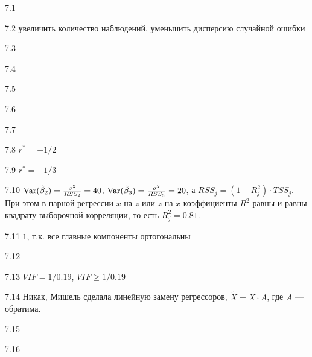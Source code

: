 \protect \hypertarget {soln:7.1}{}
\begin{solution}{{7.1}}
\end{solution}
\protect \hypertarget {soln:7.2}{}
\begin{solution}{{7.2}}
увеличить количество наблюдений, уменьшить дисперсию случайной ошибки
\end{solution}
\protect \hypertarget {soln:7.3}{}
\begin{solution}{{7.3}}
\end{solution}
\protect \hypertarget {soln:7.4}{}
\begin{solution}{{7.4}}
\end{solution}
\protect \hypertarget {soln:7.5}{}
\begin{solution}{{7.5}}
\end{solution}
\protect \hypertarget {soln:7.6}{}
\begin{solution}{{7.6}}
\end{solution}
\protect \hypertarget {soln:7.7}{}
\begin{solution}{{7.7}}
\end{solution}
\protect \hypertarget {soln:7.8}{}
\begin{solution}{{7.8}}
$r^* = -1/2$
\end{solution}
\protect \hypertarget {soln:7.9}{}
\begin{solution}{{7.9}}
$r^* = -1/3$
\end{solution}
\protect \hypertarget {soln:7.10}{}
\begin{solution}{{7.10}}
$\operatorname{Var}(\hat{\beta}_2)=\frac{\sigma^2}{RSS_2}=40$, $\operatorname{Var}(\hat{\beta}_3)=\frac{\sigma^2}{RSS_3}=20$, а $RSS_j=(1-R^2_j) \cdot TSS_j$. При этом в парной регрессии $x$ на $z$ или $z$ на $x$ коэффициенты $R^2$ равны и равны квадрату выборочной корреляции, то есть $R^2_j=0.81$.
\end{solution}
\protect \hypertarget {soln:7.11}{}
\begin{solution}{{7.11}}
$1$, т.к. все главные компоненты ортогональны
\end{solution}
\protect \hypertarget {soln:7.12}{}
\begin{solution}{{7.12}}

\end{solution}
\protect \hypertarget {soln:7.13}{}
\begin{solution}{{7.13}}
$VIF=1/0.19$, $VIF\geq 1/0.19$
\end{solution}
\protect \hypertarget {soln:7.14}{}
\begin{solution}{{7.14}}
Никак, Мишель сделала линейную замену регрессоров, $\tilde X = X \cdot A$, где $A$ — обратима.
\end{solution}
\protect \hypertarget {soln:7.15}{}
\begin{solution}{{7.15}}
\end{solution}
\protect \hypertarget {soln:7.16}{}
\begin{solution}{{7.16}}
\end{solution}
